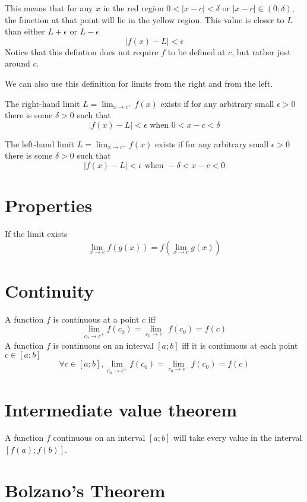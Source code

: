 \documentclass{article}
\begin{document}
This means that for any \(x\) in the red region \(0<|x-c|<\delta\text{ or }|x-c|\in (0; \delta)\),
the function at that point will lie in the yellow region.
This value is closer to \(L\) than either \(L + \epsilon\) or \(L - \epsilon\)
\[
    |f(x) - L| < \epsilon
\]
Notice that this defintion does not require \(f\) to be defined at \(c\), but rather just around \(c\).

We can also use this definition for limits from the right and from the left.

The right-hand limit \(L=\lim_{x\to c^{+}}f(x)\) exists if for any arbitrary small \(\epsilon > 0\)
there is some \(\delta > 0\) such that
\[
    |f(x)-L|<\epsilon \text{ when } 0 < x-c < \delta
\]

The left-hand limit \(L=\lim_{x\to c^{-}}f(x)\) exists if for any arbitrary small \(\epsilon > 0\)
there is some \(\delta > 0\) such that
\[
    |f(x)-L|<\epsilon \text{ when } -\delta < x-c < 0
\]

\pagebreak

\section{Properties}

If the limit exists
\[
    \lim_{x\to c}f(g(x))=f(\lim_{x\to c}g(x))
\]

\section{Continuity}

A function \(f\) is continuous at a point \(c\) iff
\[
    \lim_{c_0 \to c^+} f(c_0) = \lim_{c_0 \to c^-} f(c_0) = f(c)
\]
A function \(f\) is continuous on an interval \([a;b]\) iff it is continuous at each point \(c \in [a;b]\)
\[
    \forall c \in [a;b],
    \lim_{c_0 \to c^+} f(c_0) = \lim_{c_0 \to c^-} f(c_0) = f(c)
\]

\section{Intermediate value theorem}

A function \(f\) continuous on an interval \([a;b]\) will take
every value in the interval \([f(a);f(b)]\).

\section{Bolzano's Theorem}
\end{document}

